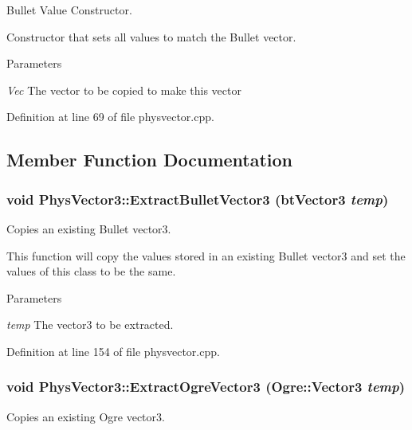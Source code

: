 Bullet Value Constructor. 

Constructor that sets all values to match the Bullet vector. 
\begin{DoxyParams}{Parameters}
\item[{\em Vec}]The vector to be copied to make this vector \end{DoxyParams}


Definition at line 69 of file physvector.cpp.



\subsection{Member Function Documentation}
\hypertarget{classPhysVector3_a71a78da9e8011cb727010f8ba3acf546}{
\subsubsection[{ExtractBulletVector3}]{\setlength{\rightskip}{0pt plus 5cm}void PhysVector3::ExtractBulletVector3 (btVector3 {\em temp})}}
\label{da/d11/classPhysVector3_a71a78da9e8011cb727010f8ba3acf546}


Copies an existing Bullet vector3. 

This function will copy the values stored in an existing Bullet vector3 and set the values of this class to be the same. 
\begin{DoxyParams}{Parameters}
\item[{\em temp}]The vector3 to be extracted. \end{DoxyParams}


Definition at line 154 of file physvector.cpp.

\hypertarget{classPhysVector3_a422acbc95f72d00a26cb477ab7db5e87}{
\subsubsection[{ExtractOgreVector3}]{\setlength{\rightskip}{0pt plus 5cm}void PhysVector3::ExtractOgreVector3 (Ogre::Vector3 {\em temp})}}
\label{da/d11/classPhysVector3_a422acbc95f72d00a26cb477ab7db5e87}


Copies an existing Ogre vector3. 

